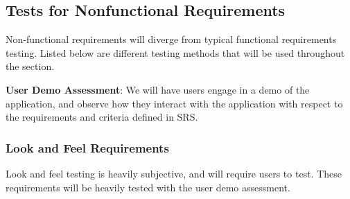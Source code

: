 \documentclass[12pt, titlepage]{article}
\begin{document}
\subsection{Tests for Nonfunctional Requirements}
Non-functional requirements will diverge from typical functional requirements
testing. Listed below are different testing methods that will be used throughout
the section.

\noindent \textbf{User Demo Assessment}: We will have users engage in a demo of the application,
and observe how they interact with the application with respect to the
requirements and criteria defined in SRS.


\subsubsection{Look and Feel Requirements}
Look and feel testing is heavily subjective, and will require users to test.
These requirements will be heavily tested with the user demo assessment.
\end{document}
